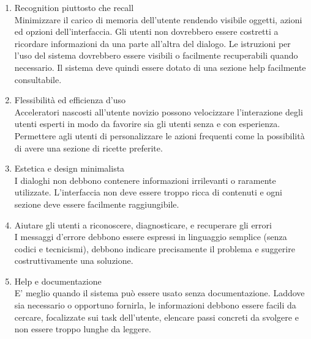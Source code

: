 \documentclass[12pt,a4paper,openright,twoside]{article}
\begin{document}
\begin{enumerate}
\item Recognition piuttosto che recall\\
Minimizzare il carico di memoria dell’utente rendendo visibile oggetti,
azioni ed opzioni dell’interfaccia. Gli utenti non dovrebbero essere costretti a ricordare informazioni da una parte all’altra del dialogo. Le istruzioni per l’uso del sistema dovrebbero essere visibili o facilmente recuperabili quando necessario. Il sistema deve quindi essere dotato di una sezione help facilmente consultabile.\\

\item Flessibilità ed efficienza d’uso\\
Acceleratori nascosti all’utente novizio possono velocizzare l’interazione
degli utenti esperti in modo da favorire sia gli utenti senza e con esperienza.
Permettere agli utenti di personalizzare le azioni frequenti come la possibilità di avere una sezione di ricette preferite.\\

\item Estetica e design minimalista\\
I dialoghi non debbono contenere informazioni irrilevanti o raramente utilizzate. L'interfaccia non deve essere troppo ricca di contenuti e ogni sezione deve essere facilmente raggiungibile.\\

\item Aiutare gli utenti a riconoscere, diagnosticare, e recuperare gli errori\\
I messaggi d’errore debbono essere espressi in linguaggio semplice (senza codici e tecnicismi), debbono indicare precisamente il problema e suggerire costruttivamente una soluzione.\\

\item Help e documentazione\\
E' meglio quando il sistema può essere usato senza documentazione. Laddove sia necessario o opportuno fornirla, le informazioni debbono essere facili da cercare, focalizzate sui task dell'utente, elencare passi concreti da svolgere e non essere troppo lunghe da leggere. 
\end{enumerate}
\end{document}
